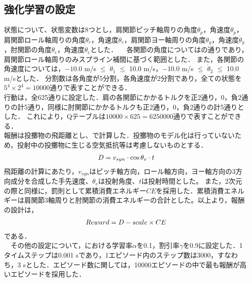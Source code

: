 \begin{small}
\subsection{強化学習の設定}
状態について、状態変数は8つとし，肩関節ピッチ軸周りの角度$\theta_{p}$，角速度$\dot{\theta}_{p}$，肩関節ロール軸周りの角度$\theta_{r}$，角速度$\dot{\theta}_{r}$，肩関節ヨー軸周りの角度$\theta_{y}$，角速度$\dot{\theta}_{y}$，肘関節の角度$\theta_{e}$，角速度$\dot{\theta}_{e}$とした．
　各関節の角度についてはの通りであり，肩関節ロール軸周りのみスプライン補間に基づく範囲とした．
また，各関節の角速度については，$-10.0$ m/s $\le$ $\dot{\theta}_{1}$ $\le$ 10.0 m/s，$-10.0$ m/s $\le$ $\dot{\theta}_{2}$ $\le$ 10.0 m/sとした．
分割数は各角度が5分割，各角速度が2分割であり，全ての状態を$5^{4}\times 2^{4}=10000$通りで表すことができる．\\
行動は，全625通りに設定した．肩の各関節にかかるトルクを正2通り，0，負2通りの計5通り，同様に肘関節にかかるトルクも正2通り，0，負2通りの計5通りとした．
これにより，Qテーブルは$10000 \times 625=6250000$通りで表すことができる．\\
報酬は投擲物の飛距離とし、で計算した．投擲物のモデル化は行っていないため，投射中の投擲物に生じる空気抵抗等は考慮しないものとする．
\begin{eqnarray}
  \equlabel{14}
  D = v_{syn} \cdot \cos\theta_{v} \cdot t
\end{eqnarray}
飛距離の計算にあたり，$v_{syn}$はピッチ軸方向，ロール軸方向，ヨー軸方向の3方向成分を合成した手先速度、$\theta_{v}$は投射角度、$t$は投射時間とした。
また，2次元の際と同様に，罰則として累積消費エネルギー$CE$を採用した．累積消費エネルギーは肩関節3軸周りと肘関節の消費エネルギーの合計とした。以上より，報酬の設計は，
\begin{eqnarray}
  \equlabel{15}
  Reward = D - scale \times CE
\end{eqnarray}
である．\\
　その他の設定について，における学習率$\alpha$を0.1，割引率$\gamma$を0.9に設定した．1タイムステップは0.001 sであり，1エピソード内のステップ数は3000，すなわち，3 sとした．エピソード数に関しては，10000エピソードの中で最も報酬が高いエピソードを採用した．

\end{small}
